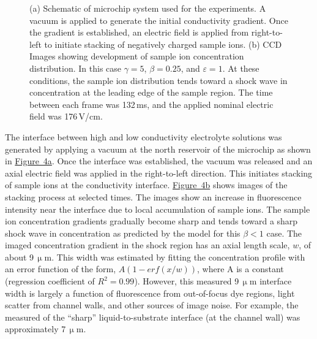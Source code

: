 \documentclass[lineno,authoryear]{FLO_v1}%
\theoremstyle{definition}
\begin{document}
\begin{figure}[]
\caption{(a) Schematic of microchip system used for the
experiments. A vacuum is applied to generate the initial
conductivity gradient. Once the gradient is established, an
electric field is applied from right-to-left to initiate
stacking of negatively charged sample ions. (b) CCD Images
showing development of sample ion concentration
distribution. In this case $\gamma=5$, $\beta=0.25$,
and $\varepsilon =1$. At these conditions, the sample ion
distribution tends toward a shock wave in concentration at
the leading edge of the sample region. The time between
each frame was 132\,ms, and the applied nominal electric
field was 176\,V/cm.\label{fig4}}
\end{figure}

The interface between high and low conductivity electrolyte
solutions was generated by applying a vacuum at the north
reservoir of the microchip as shown in
\hyperref[fig4]{Figure~4a}. Once the interface was
established, the vacuum was released and an axial electric
field was applied in the right-to-left direction. This
initiates stacking of sample ions at the conductivity
interface. \hyperref[fig4]{Figure~4b} shows images of the
stacking process at selected times. The images show an
increase in fluorescence intensity near the interface due
to local accumulation of sample ions. The sample ion
concentration gradients gradually become sharp and tends
toward a sharp shock wave in concentration as predicted by
the model for this $\beta<1$ case. The imaged concentration
gradient in the shock region has an axial length scale,
$w$, of about 9\,$\upmu$m. This width was estimated by
fitting the concentration profile with an error function of
the form, $A(1-erf(x/w))$, where A is a constant
(regression coefficient of $R^{2}=0.99$). However, this
measured 9\,$\upmu$m interface width is largely a function
of fluorescence from out-of-focus dye regions, light
scatter from channel walls, and other sources of image
noise. For example, the measured of the ``sharp''
liquid-to-substrate interface (at the channel wall) was
approximately 7\,$\upmu$m.
\end{document}
